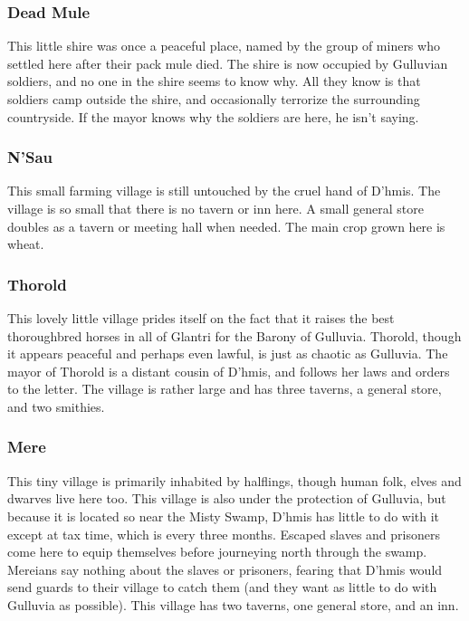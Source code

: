 \documentclass[palace_of_the_silver_princess]{subfiles}
\begin{document}
\subsubsection{Dead Mule}

This little shire was once a peaceful place, named by the group of
miners who settled here after their pack mule died.  The shire is now
occupied by Gulluvian soldiers, and no one in the shire seems to know
why. All they know is that soldiers camp outside the shire, and
occasionally terrorize the surrounding countryside. If the mayor knows
why the soldiers are here, he isn’t saying.

\subsubsection{N'Sau}

This small farming village is still untouched by the cruel hand of
D’hmis. The village is so small that there is no tavern or inn here. A
small general store doubles as a tavern or meeting hall when needed. The
main crop grown here is wheat.

\subsubsection{Thorold}

This lovely little village prides itself on the fact that it raises the
best thoroughbred horses in all of Glantri for the Barony of Gulluvia.
Thorold, though it appears peaceful and perhaps even lawful, is just as
chaotic as Gulluvia. The mayor of Thorold is a distant cousin of D’hmis,
and follows her laws and orders to the letter. The village is rather
large and has three taverns, a general store, and two smithies.

\subsubsection{Mere}

This tiny village is primarily inhabited by halflings, though human
folk, elves and dwarves live here too. This village is also under the
protection of Gulluvia, but because it is located so near the Misty
Swamp, D’hmis has little to do with it except at tax time, which is
every three months. Escaped slaves and prisoners come here to equip
themselves before journeying north through the swamp. Mereians say
nothing about the slaves or prisoners, fearing that D’hmis would send
guards to their village to catch them (and they want as little to do
with Gulluvia as possible). This village has two taverns, one general
store, and an inn.
\end{document}
